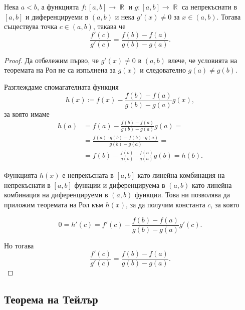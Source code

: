 \documentclass{../../common/topic}
\begin{document}
\begin{theorem}
  Нека \( a < b \), а функцията \( f: [a, b] \to \BbbR \) и \( g: [a, b] \to \BbbR \) са непрекъснати в \( [a, b] \) и диференцируеми в \( (a, b) \) и нека \( g'(x) \neq 0 \) за \( x \in (a, b) \). Тогава съществува точка \( c \in (a, b) \), такава че
  \begin{equation*}
    \frac {f'(c)} {g'(c)} = \frac {f(b) - f(a)} {g(b) - g(a)}.
  \end{equation*}
\end{theorem}
\begin{proof}
  Да отбележим първо, че \( g'(x) \neq 0 \) в \( (a, b) \) влече, че условията на теоремата на Рол не са изпълнена за \( g(x) \) и следователно \( g(a) \neq g(b) \).

  Разглеждаме спомагателната функция
  \begin{equation*}
    h(x) \coloneqq f(x) - \frac {f(b) - f(a)} {g(b) - g(a)} g(x),
  \end{equation*}
  за която имаме
  \begin{align*}
    h(a)
    &=
    f(a) - \frac {f(b) - f(a)} {g(b) - g(a)} g(a)
    = \\ &=
    \frac {f(a) \cdot g(b) - f(b) \cdot g(a)} {g(b)-g(a)}
    = \\ &=
    f(b) - \frac {f(b) - f(a)} {g(b) - g(a)} g(b)
    =
    h(b).
  \end{align*}

  Функцията \( h(x) \) е непрекъсната в \( [a, b] \) като линейна комбинация на непрекъснати в \( [a, b] \) функции и диференцируема в \( (a, b) \) като линейна комбинация на диференцируеми в \( (a, b) \) функции. Това ни позволява да приложим теоремата на Рол към \( h(x) \), за да получим константа \( c \), за която

  \begin{equation*}
    0 = h'(c) = f'(c) - \frac {f(b) - f(a)} {g(b) - g(a)} g'(c).
  \end{equation*}

  Но тогава
  \begin{equation*}
    \frac {f'(c)} {g'(c)} = \frac {f(b) - f(a)} {g(b) - g(a)}.
  \end{equation*}
\end{proof}

\subsection{Теорема на Тейлър}
\end{document}
